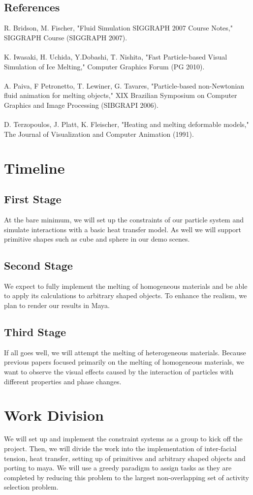 \documentclass[pdftex,12pt]{article}
\begin{document}
    \subsection{References}
    R. Bridson, M. Fischer, "Fluid Simulation SIGGRAPH 2007 Course Notes," SIGGRAPH Course (SIGGRAPH 2007). \\\\
    K. Iwasaki, H. Uchida, Y.Dobashi, T. Nishita, "Fast Particle-based Visual Simulation of Ice Melting," Computer Graphics Forum (PG 2010). \\\\
    A. Paiva, F Petronetto, T. Lewiner, G. Tavares, "Particle-based non-Newtonian fluid animation for melting objects," XIX Brazilian Symposium on Computer Graphics and Image Processing (SIBGRAPI 2006). \\\\
    D. Terzopoulos, J. Platt, K. Fleischer, "Heating and melting deformable models," The Journal of Visualization and Computer Animation (1991).

\section{Timeline}
    \subsection{First Stage}
    At the bare minimum, we will set up the constraints of our particle system and simulate interactions with a basic heat transfer model. As well we will support primitive shapes such as cube and sphere in our demo scenes.
    \subsection{Second Stage}
    We expect to fully implement the melting of homogeneous materials and be able to apply its calculations to arbitrary shaped objects. To enhance the realism, we plan to render our results in Maya.
    \subsection{Third Stage}
    If all goes well, we will attempt the melting of heterogeneous materials. Because previous papers focused primarily on the melting of homogeneous materials, we want to observe the visual effects caused by the interaction of particles with different properties and phase changes.

\pagebreak
\section{Work Division}
We will set up and implement the constraint systems as a group to kick off the project. Then, we will divide the work into the implementation of inter-facial tension, heat transfer, setting up of primitives and arbitrary shaped objects and porting to maya. We will use a greedy paradigm to assign tasks as they are completed by reducing this problem to the largest non-overlapping set of activity selection problem.
\end{document}
